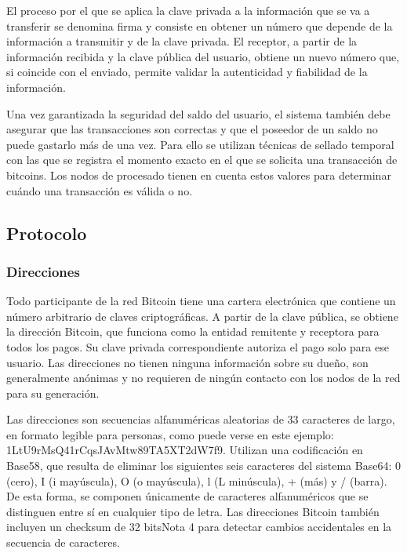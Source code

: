 El proceso por el que se aplica la clave privada a la informaci\'on que se va a transferir se 
denomina firma y consiste en obtener un n\'umero que depende de la informaci\'on a 
transmitir y de la clave privada. El receptor, a partir de la informaci\'on recibida y la clave 
p\'ublica del usuario, obtiene un nuevo n\'umero que, si coincide con el enviado, permite 
validar la autenticidad y fiabilidad de la informaci\'on. 
 
Una vez garantizada la seguridad del saldo del usuario, el sistema tambi\'en debe asegurar 
que las transacciones son correctas y que el poseedor de un saldo no puede gastarlo m\'as de 
una vez. Para ello se utilizan t\'ecnicas de sellado temporal con las que se registra el momento 
exacto en el que se solicita una transacci\'on de bitcoins. Los nodos de procesado tienen en 
cuenta estos valores para determinar cu\'ando una transacci\'on es v\'alida o no.

\subsection{Protocolo}

\subsubsection{Direcciones}

Todo participante de la red Bitcoin tiene una cartera electr\'onica que contiene un n\'umero arbitrario de claves criptogr\'aficas. A partir de la clave p\'ublica, se obtiene la direcci\'on Bitcoin, que funciona como la entidad remitente y receptora para todos los pagos. Su clave privada correspondiente autoriza el pago solo para ese usuario. Las direcciones no tienen ninguna informaci\'on sobre su dueño, son generalmente an\'onimas y no requieren de ning\'un contacto con los nodos de la red para su generaci\'on.

Las direcciones son secuencias alfanum\'ericas aleatorias de 33 caracteres de largo, en formato legible para personas, como puede verse en este ejemplo: 1LtU9rMsQ41rCqsJAvMtw89TA5XT2dW7f9. Utilizan una codificaci\'on en Base58, que resulta de eliminar los siguientes seis caracteres del sistema Base64: 0 (cero), I (i may\'uscula), O (o may\'uscula), l (L min\'uscula), + (m\'as) y / (barra). De esta forma, se componen \'unicamente de caracteres alfanum\'ericos que se distinguen entre s\'i en cualquier tipo de letra. Las direcciones Bitcoin tambi\'en incluyen un checksum de 32 bitsNota 4 para detectar cambios accidentales en la secuencia de caracteres.

